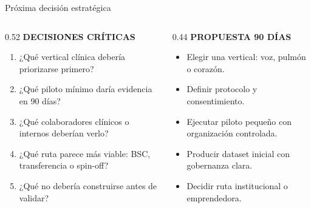 \documentclass[10pt,aspectratio=169]{beamer}
\newcommand{\DMLEyebrow}[1]{%
  {\scriptsize\bfseries\color{DMLGreen}#1}\vspace{0.08cm}
}
\begin{document}
\begin{frame}{Próxima decisión estratégica}
  \begin{columns}[T,totalwidth=\textwidth]
    \begin{column}{0.52\textwidth}
      \DMLEyebrow{DECISIONES CRÍTICAS}
      \begin{enumerate}
        \item ¿Qué vertical clínica debería priorizarse primero?
        \item ¿Qué piloto mínimo daría evidencia en 90 días?
        \item ¿Qué colaboradores clínicos o internos deberían verlo?
        \item ¿Qué ruta parece más viable: BSC, transferencia o spin-off?
        \item ¿Qué no debería construirse antes de validar?
      \end{enumerate}
    \end{column}
    \begin{column}{0.44\textwidth}
      \DMLEyebrow{PROPUESTA 90 DÍAS}
      \begin{itemize}
        \item Elegir una vertical: voz, pulmón o corazón.
        \item Definir protocolo y consentimiento.
        \item Ejecutar piloto pequeño con organización controlada.
        \item Producir dataset inicial con gobernanza clara.
        \item Decidir ruta institucional o emprendedora.
      \end{itemize}
    \end{column}
  \end{columns}
\end{frame}
\end{document}
